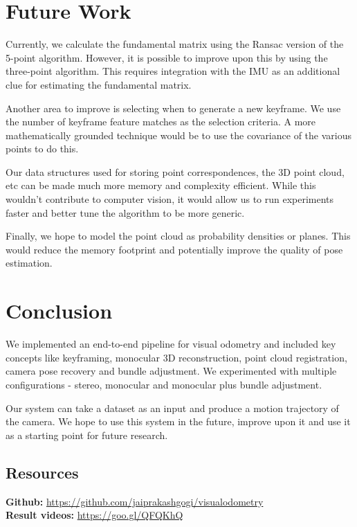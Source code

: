 \documentclass{article}
\begin{document}
\section{Future Work}

Currently, we calculate the fundamental matrix using the Ransac version of the 5-point algorithm. However, it is possible to improve upon this by using the three-point algorithm\cite{threepoint}. This requires integration with the IMU as an additional clue for estimating the fundamental matrix.

Another area to improve is selecting when to generate a new keyframe. We use the number of keyframe feature matches as the selection criteria. A more mathematically grounded technique would be to use the covariance of the various points to do this.

Our data structures used for storing point correspondences, the 3D point cloud, etc can be made much more memory and complexity efficient. While this wouldn't contribute to computer vision, it would allow us to run experiments faster and better tune the algorithm to be more generic.

Finally, we hope to model the point cloud as probability densities or planes. This would reduce the memory footprint and potentially improve the quality of pose estimation.

\section{Conclusion}
We implemented an end-to-end pipeline for visual odometry and included key concepts like keyframing, monocular 3D reconstruction, point cloud registration, camera pose recovery and bundle adjustment. We experimented with multiple configurations - stereo, monocular and monocular plus bundle adjustment.

Our system can take a dataset as an input and produce a motion trajectory of the camera. We hope to use this system in the future, improve upon it and use it as a starting point for future research.

\subsection{Resources}
\textbf{Github: } \url{https://github.com/jaiprakashgogi/visualodometry}\\
\textbf{Result videos: } \url{https://goo.gl/QFQKhQ}




\end{document}
